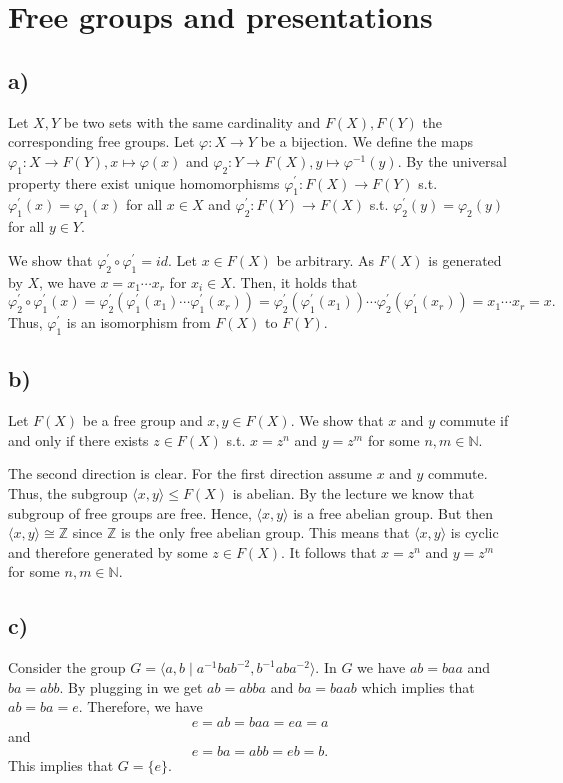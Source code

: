 \section{Free groups and presentations}
\subsection*{a)}
Let $X, Y$ be two sets with the same cardinality and $F(X), F(Y)$ the corresponding free groups. Let $\varphi : X \rightarrow Y$ be a bijection. We define the maps $\varphi_1 : X \rightarrow F(Y), x \mapsto \varphi(x)$ and $\varphi_2 : Y \rightarrow F(X), y \mapsto \varphi^{-1}(y)$. By the universal property there exist unique homomorphisms $\varphi_1^\prime : F(X) \rightarrow F(Y)$ s.t. $\varphi_1^\prime(x) = \varphi_1(x)$ for all $x \in X$ and $\varphi_2^\prime : F(Y) \rightarrow F(X)$ s.t. $\varphi_2^\prime(y) = \varphi_2(y)$ for all $y \in Y$.

We show that $\varphi_2^\prime \circ \varphi_1^\prime = id$. Let $x \in F(X)$ be arbitrary. As $F(X)$ is generated by $X$, we have $x = x_1 \cdots x_r$ for $x_i \in X$. Then, it holds that
\[ \varphi_2^\prime \circ \varphi_1^\prime(x) = \varphi_2^\prime(\varphi_1^\prime(x_1) \cdots \varphi_1^\prime(x_r)) = \varphi_2^\prime(\varphi_1^\prime(x_1)) \cdots \varphi_2^\prime(\varphi_1^\prime(x_r)) = x_1 \cdots x_r = x. \]
Thus, $\varphi_1^\prime$ is an isomorphism from $F(X)$ to $F(Y)$.


\subsection*{b)}
Let $F(X)$ be a free group and $x, y \in F(X)$. We show that $x$ and $y$ commute if and only if there exists $z \in F(X)$ s.t. $x = z^n$ and $y = z^m$ for some $n, m \in \mathds{N}$.

The second direction is clear. For the first direction assume $x$ and $y$ commute. Thus, the subgroup $\langle x,y \rangle \leq F(X)$ is abelian. By the lecture we know that subgroup of free groups are free. Hence, $\langle x,y \rangle$ is a free abelian group. But then $\langle x,y \rangle \cong \mathds{Z}$ since $\mathds{Z}$ is the only free abelian group. This means that $\langle x,y \rangle$ is cyclic and therefore generated by some $z \in F(X)$. It follows that $x = z^n$ and $y = z^m$ for some $n, m \in \mathds{N}$.

\subsection*{c)}
Consider the group $G = \langle a,b \mid a^{-1}bab^{-2}, b^{-1}aba^{-2} \rangle$. In $G$ we have $ab = baa$ and $ba = abb$. By plugging in we get $ab = abba$ and $ba = baab$ which implies that $ab = ba = e$. Therefore, we have
\[ e = ab = baa = ea = a \]
and
\[ e = ba = abb = eb = b. \]
This implies that $G = \{e\}$.
